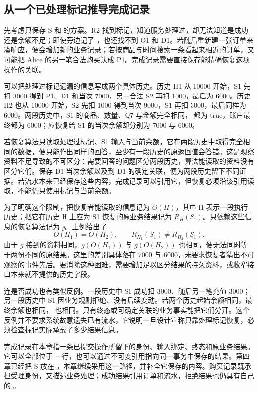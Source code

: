 \subsection*{从一个已处理标记推导完成记录}

先考虑只保存 S 和  的方案。R2 找到标记，知道服务处理过，却无法知道是成功还是余额不足；即使旁边记了 ，也还找不到 O1 和 D1。若随后重新建一张订单来凑响应，便会增加新的业务记录；若按商品与时间搜索一条看起来相近的订单，又可能把 Alice 的另一笔合法购买认成 P1。完成记录需要直接保存能精确恢复这项操作的关联。

可以把处理过标记遗漏的信息写成两个具体历史。历史 H1 从 10000 开始，S1 先扣 3000 得到 P1、D1 和当次 7000，另一合法 S2 再扣 1000，最后为 6000。历史 H2 也从 10000 开始，S2 先扣 1000 得到当次 9000，S1 再扣 3000，最后同样为 6000。两段历史中，S1 的商品、数量、Q7 与金额完全相同， 都为 true，账户最终都为 6000；应恢复给 S1 的当次余额却分别为 7000 与 6000。



若恢复算法只读取处理过标记、S1 输入与当前余额，它在两段历史中取得完全相同的数据，便只能作出同样的回答，至少有一段历史的原返回值会答错。这是观察资料不足导致的不可区分：需要回答的问题区分两段历史，算法能读取的资料没有区分它们。保存 D1 当次余额以及到 D1 的确定关联，便为两段历史留下不同证据。若流水本来已经保存这些内容，完成记录可以引用它，但恢复必须沿该引用读取，不能仍只使用标记与当前余额。

为了明确这个限制，把恢复者能读取的信息记为 \(O(H)\)，其中 H 表示一段执行历史；把它在历史 H 上应为 S1 恢复的原业务结果记为 \(R_H(S_1)\)。只依赖这些信息的恢复算法记为 \(g\)。上例给出了
\[
 O(H_1)=O(H_2),\qquad R_{H_1}(S_1)\ne R_{H_2}(S_1).
\]
由于 \(g\) 接到的资料相同，\(g(O(H_1))\) 与 \(g(O(H_2))\) 也相同，便无法同时等于两份不同的原结果。这里的差别具体落在 7000 与 6000，未要求恢复者猜出不可观察的事件先后。要消除这种困难，需要增加足以区分结果的持久资料，或收窄接口本来就不提供的历史字段。

连是否成功也有类似反例。一段历史中 S1 成功扣 3000、随后另一笔充值 3000；另一段历史中 S1 因业务规则拒绝、没有后续变动。若两个历史起始余额相同，最终余额也相同， 也相同。只有终态或可确定关联的业务事实能把它们分开。这个反例并不要求系统故意遗失已有流水，它说明一旦设计宣称只靠处理标记恢复，必须检查标记实际承载了多少结果信息。

完成记录在本章指一条已提交操作所留下的身份、输入绑定、终态和原业务结果。它可以全部位于  一行，也可以通过不可变引用指向同一事务中保存的结果。第四章已经把 S 放在 ，本章继续采用这一路径，并补全它保存的内容。购买记录既承担受理身份，又描述业务处理；成功结果引用订单和流水，拒绝结果也仍具有自己的 。

